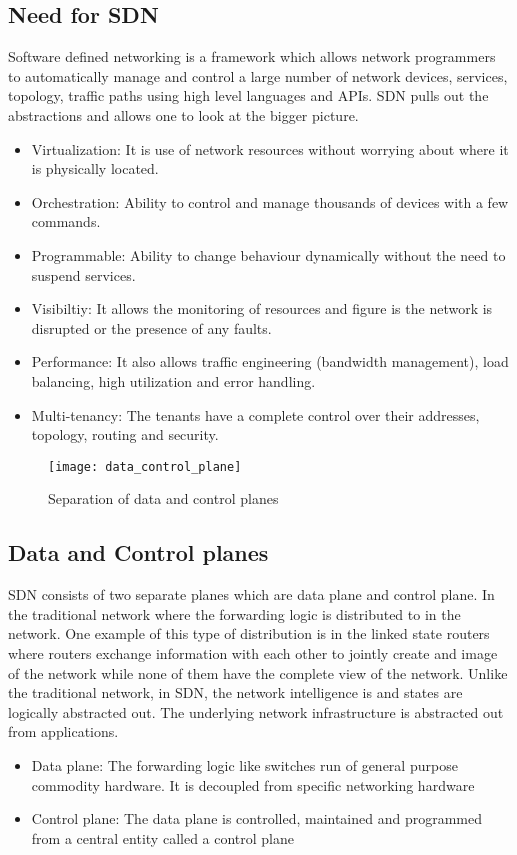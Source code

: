 \subsection{Need for SDN}
Software defined networking is a framework which allows network programmers to automatically manage and control a large number of network devices, services, topology, traffic paths using high level languages and APIs. SDN pulls out the abstractions and allows one to look at the bigger picture. 
\begin{itemize}
    \item Virtualization: It is use of network resources without worrying about where it is physically located.
    \item Orchestration: Ability to control and manage thousands of devices with a few commands.
    \item Programmable: Ability to change behaviour dynamically without the need to suspend services.
    \item Visibiltiy: It allows the monitoring of resources and figure is the network is disrupted or the presence of any faults.
    \item Performance: It also allows traffic engineering (bandwidth management), load balancing, high utilization and error handling.
    \item Multi-tenancy: The tenants have a complete control over their addresses, topology, routing and security.
\end{itemize}

\begin{figure}[h]
\begin{center}	
\texttt{[image: data\_control\_plane]} 
\caption{Separation of data and control planes }
\label{fig:data_control_plane}
\end{center}
\end{figure}

\subsection{Data and Control planes}
SDN consists of two separate planes which are data plane and control plane. In the traditional network where the forwarding logic is distributed to in the network. One example of this type of distribution is in the linked state routers where routers exchange information with each other to jointly create and image of the network while none of them have the complete view of the network. Unlike the traditional network, in SDN, the network intelligence is and states are logically abstracted out. The underlying network infrastructure is abstracted out from applications.
\begin{itemize}
    \item Data plane: The forwarding logic like switches run of general purpose commodity hardware. It is decoupled from specific networking hardware
    \item Control plane: The data plane is controlled, maintained and programmed from a central entity called a control plane 
\end{itemize}

